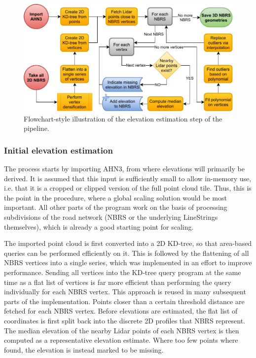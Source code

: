 \begin{figure}
    \centering
    \includegraphics[width=0.9\linewidth]{final_report/figs/elevation_estimation.pdf}
    \caption{Flowchart-style illustration of the elevation estimation step of the pipeline.}
    \label{fig:elevationestimationflow}
\end{figure}

\subsubsection{Initial elevation estimation}

The process starts by importing AHN3, from where elevations will primarily be derived. It is assumed that this input is sufficiently small to allow in-memory use, i.e. that it is a cropped or clipped version of the full point cloud tile. Thus, this is the point in the procedure, where a global scaling solution would be most important. All other parts of the program work on the basis of processing subdivisions of the road network (NBRS or the underlying LineStrings themselves), which is already a good starting point for scaling.

The imported point cloud is first converted into a 2D KD-tree, so that area-based queries can be performed efficiently on it. This is followed by the flattening of all NBRS vertices into a single series, which was implemented in an effort to improve performance. Sending all vertices into the KD-tree query program at the same time as a flat list of vertices is far more efficient than performing the query individually for each NBRS vertex. This approach is reused in many subsequent parts of the implementation. Points closer than a certain threshold distance are fetched for each NBRS vertex. Before elevations are estimated, the flat list of coordinates is first split back into the discrete 2D profiles that NBRS represent. The median elevation of the nearby Lidar points of each NBRS vertex is then computed as a representative elevation estimate. Where too few points where found, the elevation is instead marked to be missing.

